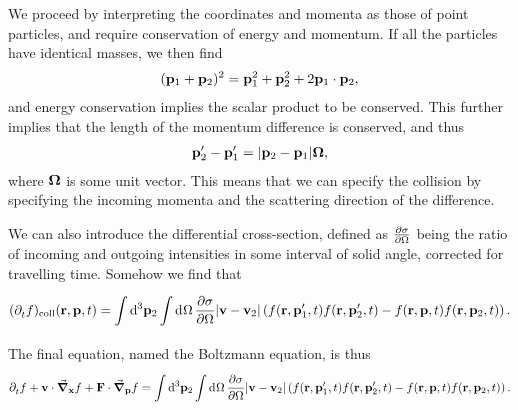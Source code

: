 We proceed by interpreting the coordinates and momenta as those of point particles, and require conservation of energy and momentum. If all the particles have identical masses, we then find
\begin{align*}
	(\vb{p}_{1} + \vb{p}_{2})^{2} = \vb{p}_{1}^{2} + \vb{p}_{2}^{2} + 2\vb{p}_{1}\cdot\vb{p}_{2},
\end{align*}
and energy conservation implies the scalar product to be conserved. This further implies that the length of the momentum difference is conserved, and thus
\begin{align*}
	\vb{p}_{2}^{\prime} - \vb{p}_{1}^{\prime} = \abs{\vb{p}_{2} - \vb{p}_{1}}\vb*{\Omega},
\end{align*}
where $\vb*{\Omega}$ is some unit vector. This means that we can specify the collision by specifying the incoming momenta and the scattering direction of the difference.

We can also introduce the differential cross-section, defined as $\pdv{\sigma}{\Omega}$ being the ratio of incoming and outgoing intensities in some interval of solid angle, corrected for travelling time. Somehow we find that
\begin{align*}
	(\partial^{}_{t}{f})_{\text{coll}}(\vb{r}, \vb{p}, t) = \int\limits_{}^{}\dd[3]{\vb{p}_{2}}\int\limits_{}^{}\dd[]{\Omega}\pdv{\sigma}{\Omega}\abs{\vb{v} - \vb{v}_{2}}\left(f(\vb{r}, \vb{p}_{1}^{\prime}, t)f(\vb{r}, \vb{p}_{2}^{\prime}, t) - f(\vb{r}, \vb{p}, t)f(\vb{r}, \vb{p}_{2}, t)\right).
\end{align*}
The final equation, named the Boltzmann equation, is thus
\begin{align*}
	\partial^{}_{t}{f} + \vb{v}\cdot\grad_{\vb{x}}{f} + \vb{F}\cdot\grad_{\vb{p}}{f} = \int\limits_{}^{}\dd[3]{\vb{p}_{2}}\int\limits_{}^{}\dd[]{\Omega}\pdv{\sigma}{\Omega}\abs{\vb{v} - \vb{v}_{2}}\left(f(\vb{r}, \vb{p}_{1}^{\prime}, t)f(\vb{r}, \vb{p}_{2}^{\prime}, t) - f(\vb{r}, \vb{p}, t)f(\vb{r}, \vb{p}_{2}, t)\right).
\end{align*}

